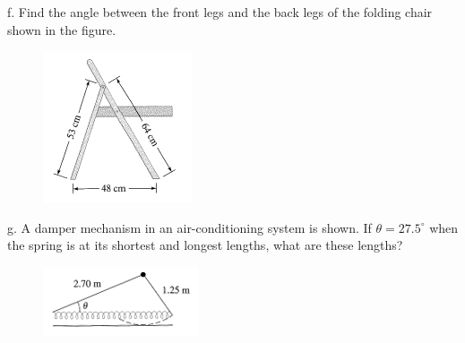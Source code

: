 \documentclass[11pt]{article}
\begin{document}
f. Find the angle between the front legs and the back legs of the
folding chair shown in the figure.

\begin{figure}[h]
   \includegraphics[scale=.3]{./tri-02.png}
\end{figure}

g. A damper mechanism in an air-conditioning system is shown. If
$\theta=27.5^{\circ}$ when the spring is at its shortest and
longest lengths, what are these lengths?

\begin{figure}[h]
   \includegraphics[scale=.3]{./tri-10.png}
\end{figure}
\end{document}
